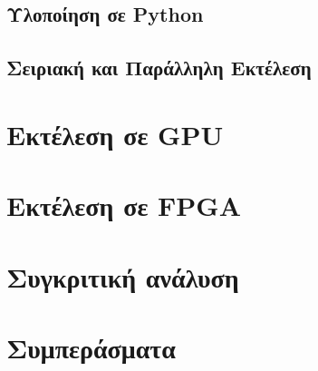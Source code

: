 \subsection{Υλοποίηση σε Python}

\subsection{Σειριακή και Παράλληλη Εκτέλεση}

\section{Εκτέλεση σε GPU}


\section{Εκτέλεση σε FPGA}
\section{Συγκριτική ανάλυση}
\section{Συμπεράσματα}